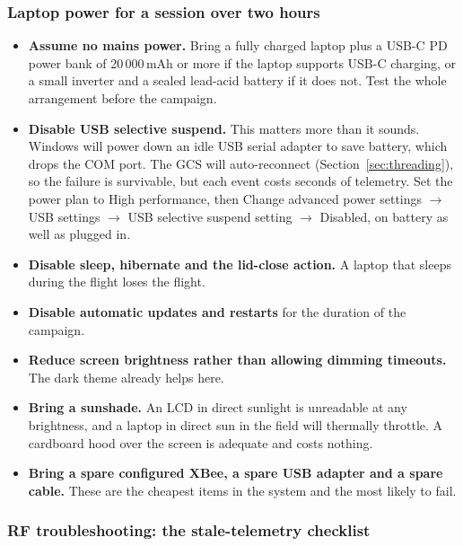 \documentclass[11pt,a4paper]{article}
\begin{document}
\subsubsection{Laptop power for a session over two hours}

\begin{itemize}
  \item \textbf{Assume no mains power.} Bring a fully charged laptop plus a
        USB-C PD power bank of 20\,000\,mAh or more if the laptop supports
        USB-C charging, or a small inverter and a sealed lead-acid battery if
        it does not. Test the whole arrangement before the campaign.
  \item \textbf{Disable USB selective suspend.} This matters more than it
        sounds. Windows will power down an idle USB serial adapter to save
        battery, which drops the COM port. The GCS will auto-reconnect
        (Section~\ref{sec:threading}), so the failure is survivable, but each
        event costs seconds of telemetry. Set the power plan to
        \textsf{High performance}, then \textsf{Change advanced power
        settings} $\rightarrow$ \textsf{USB settings} $\rightarrow$
        \textsf{USB selective suspend setting} $\rightarrow$
        \textsf{Disabled}, on battery as well as plugged in.
  \item \textbf{Disable sleep, hibernate and the lid-close action.} A laptop
        that sleeps during the flight loses the flight.
  \item \textbf{Disable automatic updates and restarts} for the duration of
        the campaign.
  \item \textbf{Reduce screen brightness rather than allowing dimming
        timeouts.} The dark theme already helps here.
  \item \textbf{Bring a sunshade.} An LCD in direct sunlight is unreadable at
        any brightness, and a laptop in direct sun in the field will thermally
        throttle. A cardboard hood over the screen is adequate and costs
        nothing.
  \item \textbf{Bring a spare configured XBee, a spare USB adapter and a
        spare cable.} These are the cheapest items in the system and the most
        likely to fail.
\end{itemize}

\subsubsection{RF troubleshooting: the stale-telemetry checklist}
\label{sec:stalechecklist}
\end{document}
